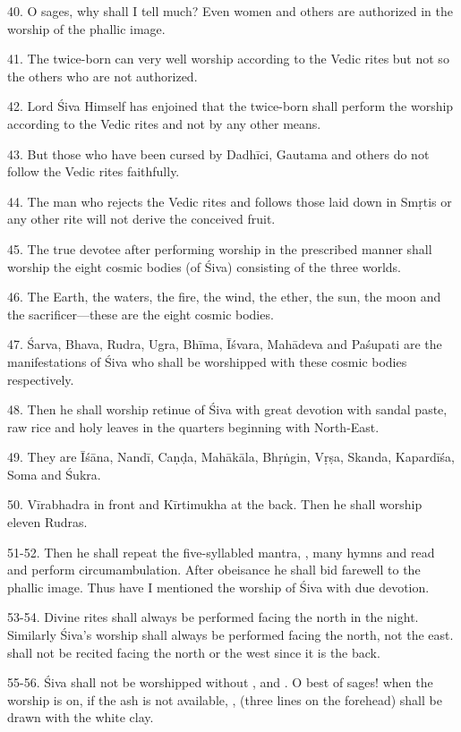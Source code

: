 40. O  sages, why shall I tell much? Even women and others are
authorized in the worship of the phallic image.

41. The twice-born can very well worship according to the Vedic rites but not so
the others who are not authorized.

42. Lord Śiva Himself has enjoined that the twice-born shall perform the worship
according to the Vedic rites and not by any other means.

43. But those  who have been cursed by Dadhīci, Gautama and others do
not follow the Vedic rites faithfully.

44. The man who rejects the Vedic rites and follows those laid down in Smṛtis or
any other rite will not derive the conceived fruit.

45. The true devotee after performing worship in the prescribed manner shall
worship the eight cosmic bodies (of Śiva) consisting of the three worlds.

46. The Earth, the waters, the fire, the wind, the ether, the sun, the moon and
the sacrificer—these are the eight cosmic bodies.

47. Śarva, Bhava, Rudra, Ugra, Bhīma, Īśvara, Mahādeva and Paśupati are
the manifestations of Śiva who shall be worshipped with these cosmic bodies
respectively.

48. Then he shall worship retinue of Śiva with great devotion with sandal paste,
raw rice and holy leaves in the quarters beginning with North-East.

49. They are Īśāna, Nandī, Caṇḍa, Mahākāla, Bhṛṅgin, Vṛṣa, Skanda, Kapardīśa,
Soma and Śukra.

50. Vīrabhadra in front and Kīrtimukha at the back. Then he shall worship eleven
Rudras.

51-52. Then he shall repeat the five-syllabled mantra, , many
 hymns and read  and perform circumambulation. After
obeisance he shall bid farewell to the phallic image. Thus have I mentioned
the worship of Śiva with due devotion.

53-54. Divine rites shall always be performed facing the north in the night.
Similarly Śiva’s worship shall always be performed facing the north, not
the east.  shall not be recited facing the north or the west
since it is the back.

55-56. Śiva shall not be worshipped without ,  and
. O best of sages! when the worship is on, if the ash is not
available, , (three lines on the forehead) shall be drawn with
the white clay.
